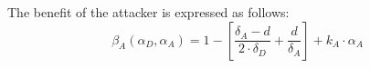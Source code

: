 The benefit of the attacker is expressed as follows:
\begin{equation}\label{first}
\beta_{A}(\alpha_{D},\alpha_{A}) = 1- [ \dfrac {\delta_{A} - d}{2 \cdot \delta_{D}} + \dfrac{d}{\delta_{A}}  ] + k_{A} \cdot \alpha_{A}
\end{equation}



%
